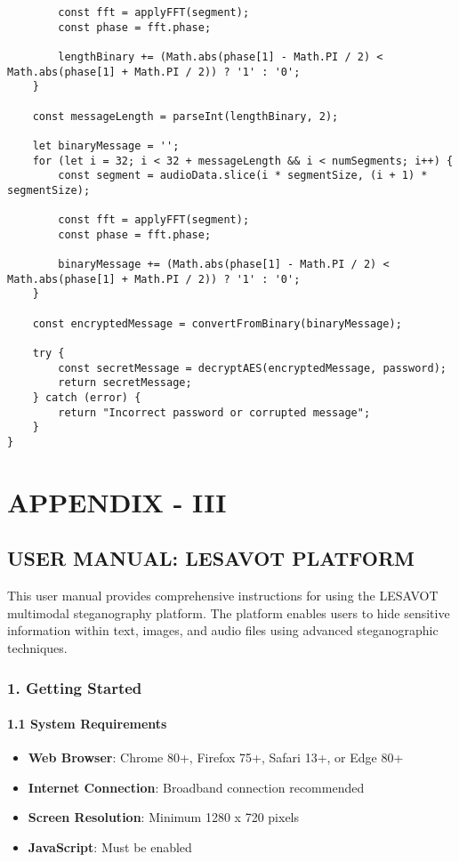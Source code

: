 \documentclass[12pt, a4paper, oneside]{book}
\begin{document}
\begin{verbatim}
        const fft = applyFFT(segment);
        const phase = fft.phase;

        lengthBinary += (Math.abs(phase[1] - Math.PI / 2) < Math.abs(phase[1] + Math.PI / 2)) ? '1' : '0';
    }

    const messageLength = parseInt(lengthBinary, 2);

    let binaryMessage = '';
    for (let i = 32; i < 32 + messageLength && i < numSegments; i++) {
        const segment = audioData.slice(i * segmentSize, (i + 1) * segmentSize);

        const fft = applyFFT(segment);
        const phase = fft.phase;

        binaryMessage += (Math.abs(phase[1] - Math.PI / 2) < Math.abs(phase[1] + Math.PI / 2)) ? '1' : '0';
    }

    const encryptedMessage = convertFromBinary(binaryMessage);

    try {
        const secretMessage = decryptAES(encryptedMessage, password);
        return secretMessage;
    } catch (error) {
        return "Incorrect password or corrupted message";
    }
}
\end{verbatim}

\chapter{APPENDIX - III}

\section*{USER MANUAL: LESAVOT PLATFORM}

This user manual provides comprehensive instructions for using the LESAVOT multimodal steganography platform. The platform enables users to hide sensitive information within text, images, and audio files using advanced steganographic techniques.

\subsection*{1. Getting Started}

\subsubsection*{1.1 System Requirements}

\begin{itemize}
    \item \textbf{Web Browser}: Chrome 80+, Firefox 75+, Safari 13+, or Edge 80+
    \item \textbf{Internet Connection}: Broadband connection recommended
    \item \textbf{Screen Resolution}: Minimum 1280 x 720 pixels
    \item \textbf{JavaScript}: Must be enabled
\end{itemize}
\end{document}
